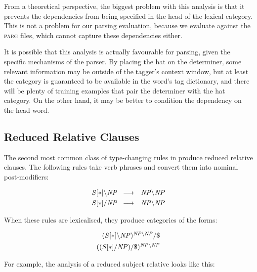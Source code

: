 From a theoretical perspective, the biggest problem with this analysis is that
it prevents the dependencies from being specified in the head of the lexical
category. This is not a problem for our parsing evaluation, because we evaluate
against the \ccgbank \textsc{parg} files, which cannot capture these
dependencies either.

It is possible that this analysis is actually favourable for
parsing, given the specific mechanisms of the \candc parser. By placing the hat
on the determiner, some relevant information may be outside of the tagger's
context window, but at least the category is guaranteed to be available in the
word's tag dictionary, and there will be plenty of training examples that pair
the determiner with the hat category. On the other hand, it may be better to
condition the dependency on the head word.

\subsection{Reduced Relative Clauses}

The second most common class of type-changing rules in \ccgbank produce reduced
relative clauses. The following rules take verb phrases and convert them into
nominal post-modifiers:

\begin{eqnarray}
 \mbox{$\it{S[*]\backslash NP}$}\;\; & \longrightarrow & \mbox{$\it{NP\backslash NP}$}\\
 \mbox{$\it{S[*]/NP}$}\;\; & \longrightarrow & \mbox{$\it{NP\backslash NP}$}
\end{eqnarray}

When these rules are lexicalised, they produce categories of the forms:

\begin{eqnarray}
\mbox{$\it{(S[*]\backslash NP)^{NP\backslash NP}/\$}$}\\
\mbox{$\it{((S[*]/NP)/\$)^{NP\backslash NP}}$}
\end{eqnarray}

For example, the analysis of a reduced subject relative looks like this:

